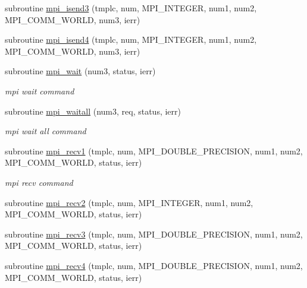 \begin{DoxyCompactItemize}
\item 
subroutine \mbox{\hyperlink{namespacempistub_a47d130d2122c960528cefcdd0295e596}{mpi\+\_\+isend3}} (tmplc, num, M\+P\+I\+\_\+\+I\+N\+T\+E\+G\+ER, num1, num2, M\+P\+I\+\_\+\+C\+O\+M\+M\+\_\+\+W\+O\+R\+LD, num3, ierr)
\item 
subroutine \mbox{\hyperlink{namespacempistub_a4afba16e08f9475afade41e36b28333c}{mpi\+\_\+isend4}} (tmplc, num, M\+P\+I\+\_\+\+I\+N\+T\+E\+G\+ER, num1, num2, M\+P\+I\+\_\+\+C\+O\+M\+M\+\_\+\+W\+O\+R\+LD, num3, ierr)
\item 
subroutine \mbox{\hyperlink{namespacempistub_abc6e6b54dd8f86227143dffe19e34fa4}{mpi\+\_\+wait}} (num3, status, ierr)
\begin{DoxyCompactList}\small\item\em mpi wait command \end{DoxyCompactList}\item 
subroutine \mbox{\hyperlink{namespacempistub_ae67c78bda40eb1d1e4dbd6c69afc6201}{mpi\+\_\+waitall}} (num3, req, status, ierr)
\begin{DoxyCompactList}\small\item\em mpi wait all command \end{DoxyCompactList}\item 
subroutine \mbox{\hyperlink{namespacempistub_a43bcd6e1779da1802197e44427742c2b}{mpi\+\_\+recv1}} (tmplc, num, M\+P\+I\+\_\+\+D\+O\+U\+B\+L\+E\+\_\+\+P\+R\+E\+C\+I\+S\+I\+ON, num1, num2, M\+P\+I\+\_\+\+C\+O\+M\+M\+\_\+\+W\+O\+R\+LD, status, ierr)
\begin{DoxyCompactList}\small\item\em mpi recv command \end{DoxyCompactList}\item 
subroutine \mbox{\hyperlink{namespacempistub_a9936e4610ebb0c4c17e99d8a6d39e562}{mpi\+\_\+recv2}} (tmplc, num, M\+P\+I\+\_\+\+I\+N\+T\+E\+G\+ER, num1, num2, M\+P\+I\+\_\+\+C\+O\+M\+M\+\_\+\+W\+O\+R\+LD, status, ierr)
\item 
subroutine \mbox{\hyperlink{namespacempistub_a86129a6bb6e924778df9e0c578f838d2}{mpi\+\_\+recv3}} (tmplc, num, M\+P\+I\+\_\+\+D\+O\+U\+B\+L\+E\+\_\+\+P\+R\+E\+C\+I\+S\+I\+ON, num1, num2, M\+P\+I\+\_\+\+C\+O\+M\+M\+\_\+\+W\+O\+R\+LD, status, ierr)
\item 
subroutine \mbox{\hyperlink{namespacempistub_ab6b89c7d5ec60b643e3c939f926430c1}{mpi\+\_\+recv4}} (tmplc, num, M\+P\+I\+\_\+\+D\+O\+U\+B\+L\+E\+\_\+\+P\+R\+E\+C\+I\+S\+I\+ON, num1, num2, M\+P\+I\+\_\+\+C\+O\+M\+M\+\_\+\+W\+O\+R\+LD, status, ierr)
\item 

\end{DoxyCompactItemize}

